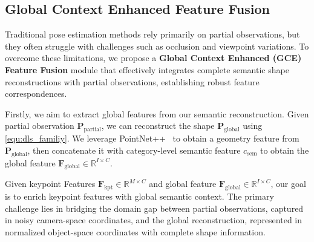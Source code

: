 \subsection{Global Context Enhanced Feature Fusion} \label{subsec:gce}
Traditional pose estimation methods rely primarily on partial observations, but they often struggle with challenges such as occlusion and viewpoint variations. To overcome these limitations, we propose a \textbf{Global Context Enhanced (GCE)  Feature Fusion} module that effectively integrates complete semantic shape reconstructions with partial observations, establishing robust feature correspondences.

Firstly, we aim to extract global features from our semantic reconstruction. Given partial observation $\mathbf{P}_{\text{partial}}$, we can reconstruct the shape \( \mathbf{P}_{\text{global}}\) using \cref{equ:dls_familiy}. We leverage PointNet++~\cite{qi2017pointnetplusplus} to obtain a geometry feature from $ \mathbf{P}_{\text{global}}$, then concatenate it with category-level semantic feature $c_{\text{sem}}$ to obtain the global feature $\mathbf{F}_{\text{global}} \in \mathbb{R}^{I \times C}$.

Given keypoint Features \( \mathbf{F}_{\text{kpt}} \in \mathbb{R}^{M \times C} \) and global feature \(\mathbf{F}_{\text{global}} \in \mathbb{R}^{I \times C} \), our goal is to enrich keypoint features with global semantic context. The primary challenge lies in bridging the domain gap between partial observations, captured in noisy camera-space coordinates, and the global reconstruction, represented in normalized object-space coordinates with complete shape information.

